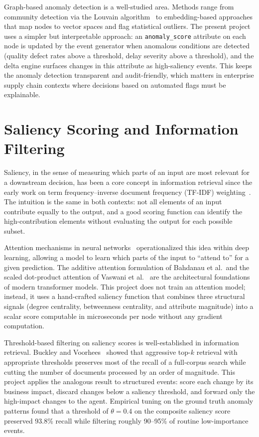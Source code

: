 Graph-based anomaly detection is a well-studied area. Methods range from community
detection via the Louvain algorithm~\citep{blondel2008louvain} to embedding-based
approaches that map nodes to vector spaces and flag statistical outliers. The present
project uses a simpler but interpretable approach: an \texttt{anomaly\_score} attribute
on each node is updated by the event generator when anomalous conditions are detected
(quality defect rates above a threshold, delay severity above a threshold), and the delta
engine surfaces changes in this attribute as high-saliency events. This keeps the
anomaly detection transparent and audit-friendly, which matters in enterprise supply
chain contexts where decisions based on automated flags must be explainable.

\section{Saliency Scoring and Information Filtering}
\label{sec:saliency}

Saliency, in the sense of measuring which parts of an input are most relevant for a
downstream decision, has been a core concept in information retrieval since the early work
on term frequency--inverse document frequency (TF-IDF) weighting~\citep{salton1988tfidf}.
The intuition is the same in both contexts: not all elements of an input contribute equally
to the output, and a good scoring function can identify the high-contribution elements
without evaluating the output for each possible subset.

Attention mechanisms in neural networks~\citep{bahdanau2015attention} operationalized this
idea within deep learning, allowing a model to learn which parts of the input to ``attend
to'' for a given prediction. The additive attention formulation of Bahdanau et al.\ and the
scaled dot-product attention of Vaswani et al.~\citep{vaswani2017attention} are the
architectural foundations of modern transformer models. This project does not train an
attention model; instead, it uses a hand-crafted saliency function that combines three
structural signals (degree centrality, betweenness centrality, and attribute magnitude)
into a scalar score computable in microseconds per node without any gradient computation.

Threshold-based filtering on saliency scores is well-established in information retrieval.
Buckley and Voorhees~\citep{buckley2000precision} showed that aggressive top-$k$ retrieval
with appropriate thresholds preserves most of the recall of a full-corpus search while
cutting the number of documents processed by an order of magnitude. This project applies
the analogous result to structured events: score each change by its business impact,
discard changes below a saliency threshold, and forward only the high-impact changes to
the agent. Empirical tuning on the ground truth anomaly patterns found that a threshold of
$\theta = 0.4$ on the composite saliency score preserved 93.8\% recall while filtering
roughly 90--95\% of routine low-importance events.


